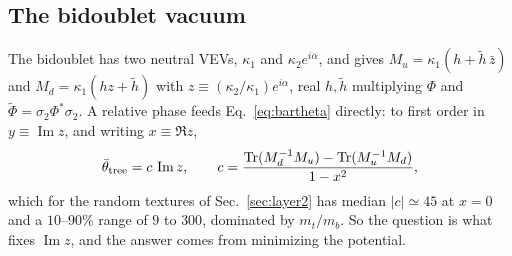\documentclass[submission, Phys]{SciPost}
\newcommand{\bt}{\bar\theta}
\DeclareMathOperator{\Tr}{Tr}
\renewcommand{\Im}{\operatorname{Im}}
\begin{document}
\subsection{The bidoublet vacuum}
\label{sec:bidoublet}

The bidoublet has two neutral VEVs, $\kappa_1$ and $\kappa_2e^{i\alpha}$,
and gives $M_u=\kappa_1(h+\tilde h\,\bar z)$ and $M_d=\kappa_1(hz+\tilde h)$
with $z\equiv(\kappa_2/\kappa_1)e^{i\alpha}$, real $h,\tilde h$
multiplying $\Phi$ and $\tilde\Phi=\sigma_2\Phi^*\sigma_2$. A relative
phase feeds Eq.~\eqref{eq:bartheta} directly: to first order in
$y\equiv\Im z$, and writing $x\equiv\Re z$,
\begin{equation}
  \bt_{\rm tree}=c\,\Im z,\qquad
  c=\frac{\Tr(M_d^{-1}M_u)-\Tr(M_u^{-1}M_d)}{1-x^2},
  \label{eq:kappaphase}
\end{equation}
which for the random textures of Sec.~\ref{sec:layer2} has median
$|c|\simeq45$ at $x=0$ and a $10$--$90\%$ range of $9$ to $300$, dominated
by $m_t/m_b$. So the question is what fixes $\Im z$, and the answer
comes from minimizing the potential.
\end{document}
